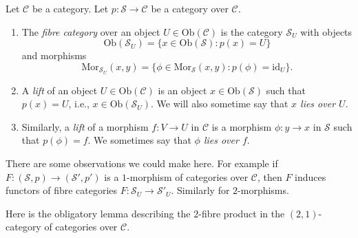 \begin{definition}
\label{definition-fibre-category}
Let $\mathcal{C}$ be a category.
Let $p : \mathcal{S} \to \mathcal{C}$ be a category over $\mathcal{C}$.
\begin{enumerate}
\item The {\it fibre category} over an object $U\in \text{Ob}(\mathcal{C})$
is the category $\mathcal{S}_U$ with objects
$$
\text{Ob}(\mathcal{S}_U) = \{x\in \text{Ob}(\mathcal{S}) :
p(x) = U\}
$$
and morphisms
$$
\text{Mor}_{\mathcal{S}_U}(x, y) = \{ \phi \in \text{Mor}_\mathcal{S}(x, y) :
p(\phi) = \text{id}_U\}.
$$
\item A {\it lift} of an object $U \in \text{Ob}(\mathcal{C})$
is an object $x\in \text{Ob}(\mathcal{S})$ such that $p(x) = U$, i.e.,
$x\in \text{Ob}(\mathcal{S}_U)$. We will also sometime say
that {\it $x$ lies over $U$}.
\item Similarly, a {\it lift} of a morphism $f : V \to U$ in $\mathcal{C}$
is a morphism $\phi : y \to x$ in $\mathcal{S}$ such that $p(\phi) = f$.
We sometimes say that {\it $\phi$ lies over $f$}.
\end{enumerate}
\end{definition}

\noindent
There are some observations we could make here. For example if
$F : (\mathcal{S}, p) \to (\mathcal{S}', p')$ is a $1$-morphism
of categories over $\mathcal{C}$, then $F$ induces functors
of fibre categories $F : \mathcal{S}_U \to \mathcal{S}'_U$.
Similarly for $2$-morphisms.

\medskip\noindent
Here is the obligatory lemma describing the $2$-fibre product in the
$(2, 1)$-category of categories over $\mathcal{C}$.

